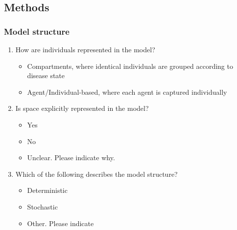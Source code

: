 \documentclass[10pt,a4paper]{article}
\begin{document}
\subsection{Methods}
	\subsubsection{Model structure }
	\begin{enumerate}[resume]
		\item How are individuals represented in the model? 
		\begin{itemize}
			\item Compartments, where identical individuals are grouped according to disease state
			\item Agent/Individual-based, where each agent is captured individually
		\end{itemize}
		\item Is space explicitly represented in the model? 
		\begin{itemize}
			\item Yes
			\item No
			\item Unclear. Please indicate why.
		\end{itemize}
		\item Which of the following describes the model structure?
		\begin{itemize}
			\item Deterministic
			\item Stochastic
			\item Other. Please indicate
		\end{itemize}
	\end{enumerate}
	
\end{document}
